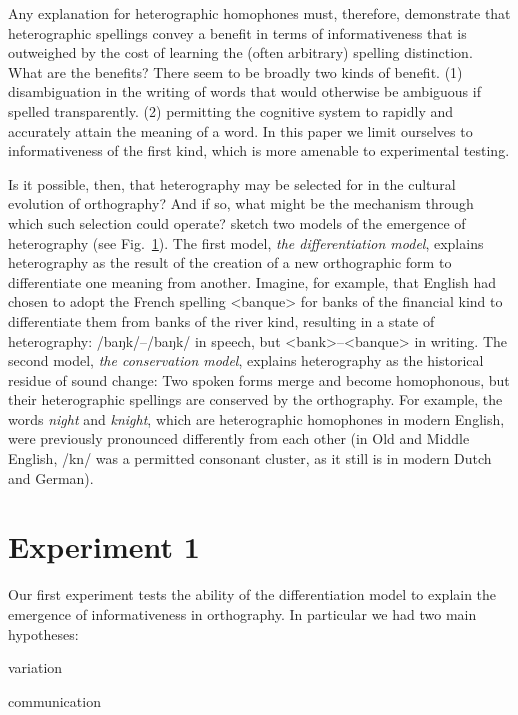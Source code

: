 \documentclass[doc,biblatex]{apa7}
\begin{document}
Any explanation for heterographic homophones must, therefore, demonstrate that heterographic spellings convey a benefit in terms of informativeness that is outweighed by the cost of learning the (often arbitrary) spelling distinction. What are the benefits? There seem to be broadly two kinds of benefit. (1) disambiguation in the writing of words that would otherwise be ambiguous if spelled transparently. (2) permitting the cognitive system to rapidly and accurately attain the meaning of a word. In this paper we limit ourselves to informativeness of the first kind, which is more amenable to experimental testing.

Is it possible, then, that heterography may be selected for in the cultural evolution of orthography? And if so, what might be the mechanism through which such selection could operate? \textcite[pp.~325--326]{Berg:2021} sketch two models of the emergence of heterography (see Fig.~\ref{}). The first model, \textit{the differentiation model}, explains heterography as the result of the creation of a new orthographic form to differentiate one meaning from another. Imagine, for example, that English had chosen to adopt the French spelling <banque> for banks of the financial kind to differentiate them from banks of the river kind, resulting in a state of heterography: /baŋk/–/baŋk/ in speech, but <bank>–<banque> in writing. The second model, \textit{the conservation model}, explains heterography as the historical residue of sound change: Two spoken forms merge and become homophonous, but their heterographic spellings are conserved by the orthography. For example, the words \textit{night} and \textit{knight}, which are heterographic homophones in modern English, were previously pronounced differently from each other (in Old and Middle English, /kn/ was a permitted consonant cluster, as it still is in modern Dutch and German).


\section{Experiment 1}

Our first experiment tests the ability of the differentiation model to explain the emergence of informativeness in orthography. In particular we had two main hypotheses:

variation

communication
\end{document}
